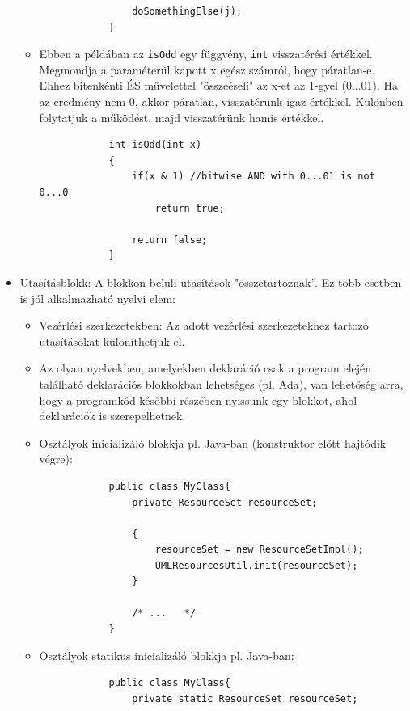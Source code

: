 \documentclass[margin=0px]{article}
\begin{document}
\begin{itemize}
\begin{itemize}
\begin{verbatim}
                doSomethingElse(j);
            }
            \end{verbatim}

              \item Ebben a példában az \texttt{isOdd} egy függvény, \texttt{int} visszatérési értékkel. Megmondja a paraméterül kapott
                    x egész számról, hogy páratlan-e. Ehhez bitenkénti ÉS művelettel "összeéseli" az x-et az 1-gyel (0...01). Ha az eredmény
                    nem 0, akkor páratlan, visszatérünk igaz értékkel. Különben folytatjuk a működést, majd visszatérünk hamis értékkel.
                    \begin{verbatim}
            int isOdd(int x)
            {
                if(x & 1) //bitwise AND with 0...01 is not 0...0
                    return true;
                    
                return false;
            }
            \end{verbatim}
          \end{itemize}

    \item	Utasításblokk: A blokkon belüli utasítások "összetartoznak”.
          Ez több esetben is jól alkalmazható nyelvi elem:
          \begin{itemize}
              \item	Vezérlési szerkezetekben: Az adott vezérlési szerkezetekhez tartozó utasításokat különíthetjük el.

              \item	Az olyan nyelvekben, amelyekben deklaráció csak a program elején található deklarációs
                    blokkokban lehetséges (pl. Ada), van lehetőség arra, hogy a programkód későbbi részében nyissunk
                    egy blokkot, ahol deklarációk is szerepelhetnek.

              \item	Osztályok inicializáló blokkja pl. Java-ban (konstruktor előtt hajtódik végre):
                    \begin{verbatim}
            public class MyClass{
                private ResourceSet resourceSet;
            
                {
                    resourceSet = new ResourceSetImpl();
                    UMLResourcesUtil.init(resourceSet);
                }
                
                /* ...   */
            }
            \end{verbatim}
              \item	Osztályok statikus inicializáló blokkja pl. Java-ban:
                    \begin{verbatim}
            public class MyClass{
                private static ResourceSet resourceSet;
                

\end{verbatim}
\end{itemize}
\end{itemize}
\end{document}
